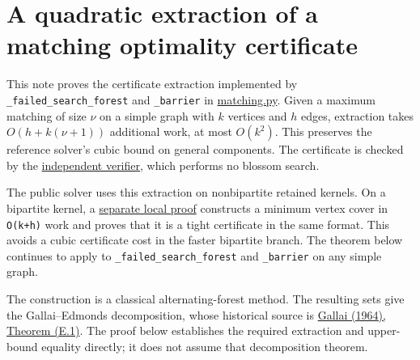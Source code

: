 
\hypertarget{af-43f6530146-a-quadratic-extraction-of-a-matching-optimality-certificate}{%
\section{A quadratic extraction of a matching optimality certificate}\label{af-43f6530146-a-quadratic-extraction-of-a-matching-optimality-certificate}}

This note proves the certificate extraction implemented by \texttt{\_failed\_search\_forest} and \texttt{\_barrier} in \href{https://github.com/icekylinx/algorithm-frontier/blob/main/problems/general-matching/reference/matching.py}{matching.py}. Given a maximum matching of size \(\nu\) on a simple graph with \(k\) vertices and \(h\) edges, extraction takes \(O(h+k(\nu+1))\) additional work, at most \(O(k^2)\). This preserves the reference solver's cubic bound on general components. The certificate is checked by the \href{https://github.com/icekylinx/algorithm-frontier/blob/main/problems/general-matching/reference/verify_certificate.py}{independent verifier}, which performs no blossom search.

The public solver uses this extraction on nonbipartite retained kernels. On a bipartite kernel, a \href{https://github.com/icekylinx/algorithm-frontier/blob/main/problems/general-matching/reference/bipartite-proof.md\#5-a-linear-certificate-on-the-first-kernel}{separate local proof} constructs a minimum vertex cover in \texttt{O(k+h)} work and proves that it is a tight certificate in the same format. This avoids a cubic certificate cost in the faster bipartite branch. The theorem below continues to apply to \texttt{\_failed\_search\_forest} and \texttt{\_barrier} on any simple graph.

The construction is a classical alternating-forest method. The resulting sets give the Gallai--Edmonds decomposition, whose historical source is \href{https://real.mtak.hu/189486/1/cut_MATKUTINT_1964_3_pp401_-_413.pdf}{Gallai (1964), Theorem (E.1)}. The proof below establishes the required extraction and upper-bound equality directly; it does not assume that decomposition theorem.

